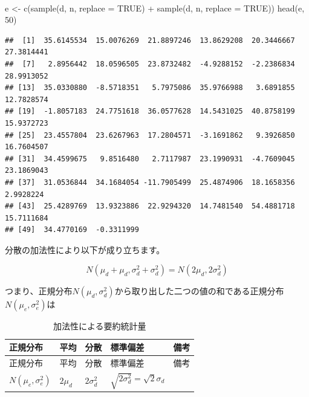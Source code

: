 \documentclass[]{tufte-handout}
\newenvironment{Shaded}{}{}
\newcommand{\AttributeTok}[1]{\textcolor[rgb]{0.49,0.56,0.16}{#1}}
\newcommand{\ConstantTok}[1]{\textcolor[rgb]{0.53,0.00,0.00}{#1}}
\newcommand{\DecValTok}[1]{\textcolor[rgb]{0.25,0.63,0.44}{#1}}
\newcommand{\FunctionTok}[1]{\textcolor[rgb]{0.02,0.16,0.49}{#1}}
\newcommand{\NormalTok}[1]{#1}
\newcommand{\OtherTok}[1]{\textcolor[rgb]{0.00,0.44,0.13}{#1}}
\newcommand{\SpecialCharTok}[1]{\textcolor[rgb]{0.25,0.44,0.63}{#1}}
\begin{document}
　

\begin{Shaded}
\begin{Highlighting}[numbers=left,,]
\NormalTok{e }\OtherTok{\textless{}{-}} \FunctionTok{c}\NormalTok{(}\FunctionTok{sample}\NormalTok{(d, n, }\AttributeTok{replace =} \ConstantTok{TRUE}\NormalTok{) }\SpecialCharTok{+} \FunctionTok{sample}\NormalTok{(d, n, }\AttributeTok{replace =} \ConstantTok{TRUE}\NormalTok{))}
\FunctionTok{head}\NormalTok{(e, }\DecValTok{50}\NormalTok{)}
\end{Highlighting}
\end{Shaded}

\begin{verbatim}
##  [1]  35.6145534  15.0076269  21.8897246  13.8629208  20.3446667  27.3814441
##  [7]   2.8956442  18.0596505  23.8732482  -4.9288152  -2.2386834  28.9913052
## [13]  35.0330880  -8.5718351   5.7975086  35.9766988   3.6891855  12.7828574
## [19]  -1.8057183  24.7751618  36.0577628  14.5431025  40.8758199  15.9372723
## [25]  23.4557804  23.6267963  17.2804571  -3.1691862   9.3926850  16.7604507
## [31]  34.4599675   9.8516480   2.7117987  23.1990931  -4.7609045  23.1869043
## [37]  31.0536844  34.1684054 -11.7905499  25.4874906  18.1658356   2.9928224
## [43]  25.4289769  13.9323886  22.9294320  14.7481540  54.4881718  15.7111684
## [49]  34.4770169  -0.3311999
\end{verbatim}

\newpage

分散の加法性により以下が成り立ちます。

\[N(\mu_d + \mu_d, \sigma^2_d + \sigma^2_d) = N(2\mu_d, 2\sigma^2_d)\]

つまり、正規分布\(N(\mu_d, \sigma^2_d)\)から取り出した二つの値の和である正規分布\(N(\mu_e, \sigma^2_e)\)は

\begin{longtable}[]{@{}
  >{\raggedright\arraybackslash}p{}
  >{\centering\arraybackslash}p{}
  >{\centering\arraybackslash}p{}
  >{\centering\arraybackslash}p{}
  >{\raggedright\arraybackslash}p{}@{}}
\caption{加法性による要約統計量}\tabularnewline
\toprule
正規分布 & 平均 & 分散 & 標準偏差 & 備考 \\
\midrule
\endfirsthead
\toprule
正規分布 & 平均 & 分散 & 標準偏差 & 備考 \\
\midrule
\endhead
\(N(\mu_e, \sigma^2_e)\) & \(2 \mu_d\) & \(2 \sigma^2_d\) &
\(\sqrt{2 \sigma^2_d} = \sqrt{2}\sigma_d\) & \\
\bottomrule
\end{longtable}
\end{document}
